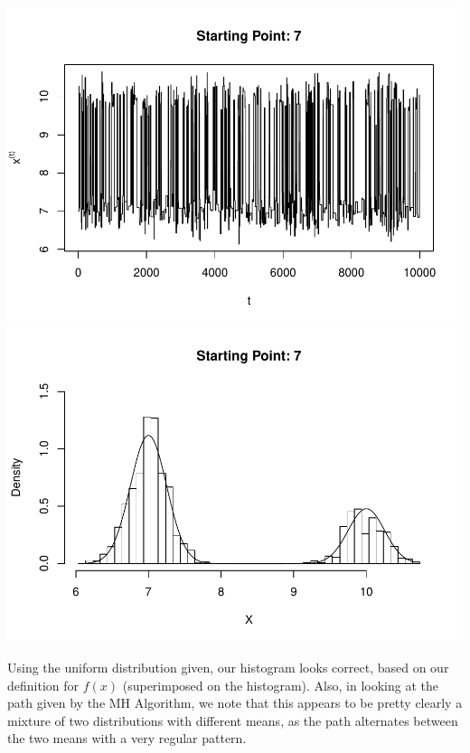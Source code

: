 \documentclass[]{article}
\begin{document}
\includegraphics{Atlas-PS_5_files/figure-latex/unnamed-chunk-6-1.pdf}
\includegraphics{Atlas-PS_5_files/figure-latex/unnamed-chunk-6-2.pdf}

Using the uniform distribution given, our histogram looks correct, based
on our definition for \(f(x)\) (superimposed on the histogram). Also, in
looking at the path given by the MH Algorithm, we note that this appears
to be pretty clearly a mixture of two distributions with different
means, as the path alternates between the two means with a very regular
pattern.
\end{document}
